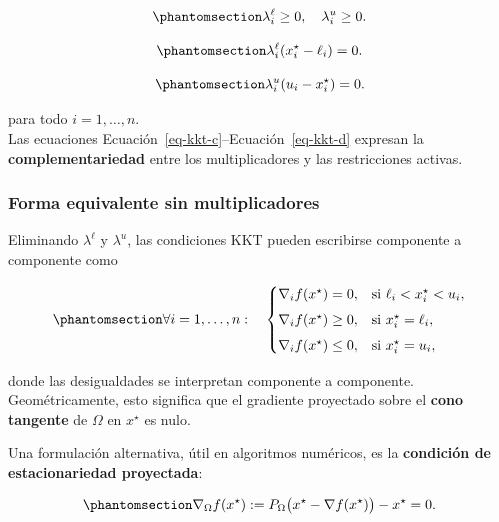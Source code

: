 \documentclass[
  spanish,
  us-letterpaper,
]{scrreprt}
\numberwithin{equation}{section}
\begin{document}
\begin{equation}\phantomsection\label{eq-kkt-b}{
\lambda_i^\ell \ge 0,\quad \lambda_i^u \ge 0.
}\end{equation}

\begin{equation}\phantomsection\label{eq-kkt-c}{
\lambda_i^\ell (x_i^\star - \ell_i) = 0.
}\end{equation}

\begin{equation}\phantomsection\label{eq-kkt-d}{
\lambda_i^u (u_i - x_i^\star) = 0.
}\end{equation}

para todo \(i = 1,\dots,n\).\\
Las ecuaciones Ecuación~\ref{eq-kkt-c}--Ecuación~\ref{eq-kkt-d} expresan
la \textbf{complementariedad} entre los multiplicadores y las
restricciones activas.

\subsubsection{Forma equivalente sin
multiplicadores}\label{forma-equivalente-sin-multiplicadores}

Eliminando \(\lambda^\ell\) y \(\lambda^u\), las condiciones KKT pueden
escribirse componente a componente como

\begin{equation}\phantomsection\label{eq-29}{
\forall i = 1,\dots,n:
\quad
\begin{cases}
\nabla_i f(x^\star) = 0, & \text{si } \ell_i < x_i^\star < u_i,\\[4pt]
\nabla_i f(x^\star) \ge 0, & \text{si } x_i^\star = \ell_i,\\[4pt]
\nabla_i f(x^\star) \le 0, & \text{si } x_i^\star = u_i,
\end{cases}
}\end{equation}

donde las desigualdades se interpretan componente a componente.\\
Geométricamente, esto significa que el gradiente proyectado sobre el
\textbf{cono tangente} de \(\Omega\) en \(x^\star\) es nulo.

Una formulación alternativa, útil en algoritmos numéricos, es la
\textbf{condición de estacionariedad proyectada}:

\begin{equation}\phantomsection\label{eq-30}{
\nabla_\Omega f(x^\star)
:= P_\Omega\big(x^\star - \nabla f(x^\star)\big) - x^\star
= 0.
}\end{equation}
\end{document}
